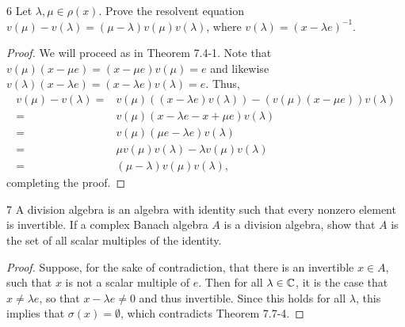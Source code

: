 \begin{exercise}{6}
Let $\lambda, \mu \in \rho(x)$.
Prove the resolvent equation $v(\mu) - v(\lambda) = (\mu - \lambda) v(\mu) v(\lambda)$, where $v(\lambda) = (x - \lambda e)^{-1}$.
\end{exercise}
\begin{proof}
We will proceed as in Theorem 7.4-1.
Note that $v(\mu) (x - \mu e) = (x - \mu e) v(\mu) = e$ and likewise $v(\lambda) (x - \lambda e) = (x - \lambda e) v(\lambda) = e$.
Thus,
\begin{align*}
    v(\mu) - v(\lambda)
    =& v(\mu) ((x - \lambda e) v(\lambda)) - (v(\mu) (x - \mu e)) v(\lambda)\\
    =& v(\mu) (x - \lambda e - x + \mu e) v(\lambda)\\
    =& v(\mu) (\mu e - \lambda e) v(\lambda)\\
    =& \mu v(\mu) v(\lambda) - \lambda v(\mu) v(\lambda)\\
    =& (\mu - \lambda) v(\mu) v(\lambda),
\end{align*}
completing the proof.
\end{proof} 

\begin{exercise}{7}
A division algebra is an algebra with identity such that every nonzero element is invertible.
If a complex Banach algebra $A$ is a division algebra, show that $A$ is the set of all scalar multiples of the identity.
\end{exercise}
\begin{proof}
Suppose, for the sake of contradiction, that there is an invertible $x \in A$, such that $x$ is not a scalar multiple of $e$.
Then for all $\lambda \in \mathbb{C}$, it is the case that $x \neq \lambda e$, so that $x - \lambda e \neq 0$ and thus invertible.
Since this holds for all $\lambda$, this implies that $\sigma(x) = \emptyset$, which contradicts Theorem 7.7-4.
\end{proof} 

